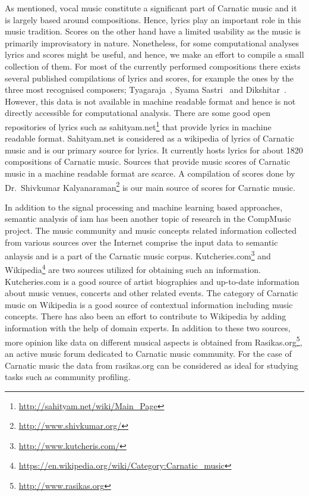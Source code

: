 As mentioned, vocal music constitute a significant part of Carnatic music and it is largely based around compositions. Hence, lyrics play an important role in this music tradition. Scores on the other hand have a limited usability as the music is primarily improvisatory in nature. Nonetheless, for some computational analyses lyrics and scores might be useful, and hence, we make an effort to compile a small collection of them. For most of the currently performed compositions there exists several published compilations of lyrics and scores, for example the ones by the three most recognised composers; Tyagaraja~\citep{TKG_Rao_Tyagaraja}, Syama Sastri~\citep{TKG_Rao_syama} and Dikshitar~\citep{TKG_Rao_Muddusvami}. However, this data is not available in machine readable format and hence is not directly accessible for computational analysis. There are some good open repositories of lyrics such as sahityam.net\footnote{\url{http://sahityam.net/wiki/Main_Page}} that provide lyrics in machine readable format. Sahityam.net is considered as a wikipedia of lyrics of Carnatic music and is our primary source for lyrics. It currently hosts lyrics for about 1820 compositions of Carnatic music. Sources that provide music scores of Carnatic music in a machine readable format are scarce. A compilation of scores done by Dr.~Shivkumar Kalyanaraman\footnote{\url{http://www.shivkumar.org/}} is our main source of scores for Carnatic music.

In addition to the signal processing and machine learning based approaches, semantic analysis of \gls{iam} has been another topic of research in the CompMusic project. The music community and music concepts related information collected from various sources over the Internet comprise the input data to semantic anlaysis and is a part of the Carnatic music corpus. Kutcheries.com\footnote{\url{http://www.kutcheris.com/}} and Wikipedia\footnote{\url{https://en.wikipedia.org/wiki/Category:Carnatic_music}} are two sources utilized for obtaining such an information. Kutcheries.com is a good source of artist biographies and up-to-date information about music venues, concerts and other related events. The category of Carnatic music on Wikipedia is a good source of contextual information including music concepts. There has also been an effort to contribute to Wikipedia by adding information with the help of domain experts. In addition to these two sources, more opinion like data on different musical aspects is obtained from Rasikas.org\footnote{\url{http://www.rasikas.org}}, an active music forum dedicated to Carnatic music community. For the case of Carnatic music the data from rasikas.org can be considered as ideal for studying tasks such as community profiling.



